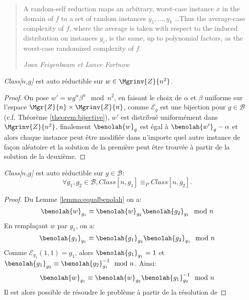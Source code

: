 	\begin{quotation}
		A random-self reduction maps an arbitrary, worst-case instance $x$ in the domain of $f$ to a set
		of random instances $y_1, \dots, y_k$ \dots Thus the average-case complexity of $f$, where the 
		average is taken with respect to the induced
		distribution on instances $y_i$, is the same, up to polynomial factors, as the worst-case 
		randomized complexity of $f$.

		\hfill \em Joan Feigenbaum et Lance Fortnow\cite{Feigenbaum91onthe}
	\end{quotation}


	\begin{lemma} \emph{Class[$n$,$g$]} est auto réductible sur $w\in\Mgrinv{Z}{n^2}$.
		\begin{proof}
			On pose $w' = wg^\alpha\beta^n\mod{n^2}$, en faisant le choix de $\alpha$ et $\beta$ 
			uniforme sur l'espace $\Mgr{Z}{n} \times \Mgrinv{Z}{n}$, comme $\mathcal{E}_g$ est une 
			bijection pour $g\in\mathcal{B}$ (c.f. Théorème \ref{theorem:bijective}), $w'$ est distribué uniformément dans
			$\Mgrinv{Z}{n^2}$, finalement $\benolah{w}_g$ est égal à  $\benolah{w'}_g-\alpha$  et alors chaque 
			instance peut être modifiée dans n'importe quel autre instance de façon aléatoire et la 
			solution de la première peut être trouvée à partir de la solution de la deuxième.
		\end{proof}
	\end{lemma}

	\begin{lemma} \emph{Class[$n$,$g$]} est auto réductible sur $g\in\mathcal{B}$: \label{lemma:reduClassg}
				$$\forall g_1, g_2 \in \mathcal{B}, Class[n,g_1] \equiv_P Class[n,g_2].$$
		\begin{proof}
			Du Lemme \ref{lemma:equalbenolah} on a:
				$$\benolah{w}_{g_1} \equiv \benolah{w}_{g_2}\benolah{g_2}_{g_1}\mod{n}$$
				En remplaçant $w$ par $g_1$, on a:
				$$\benolah{g_1}_{g_1} \equiv \benolah{g_1}_{g_2}\benolah{g_2}_{g_1}\mod{n}$$
				Comme $\mathcal{E}_{g_1}(1,1) = g_1$, alors $\benolah{g_1}_{g_1} = 1$ et 
				$\benolah{g_1}_{g_2} \equiv \benolah{g_2}_{g_1}^{-1}\mod{n}$. Ainsi:
				$$\benolah{w}_{g_1} \equiv \benolah{w}_{g_2}\benolah{g_1}_{g_2}^{-1}\mod{n}$$
				Il est alors possible de résoudre le problème  à partir de la résolution de 
		\end{proof}
	\end{lemma}

